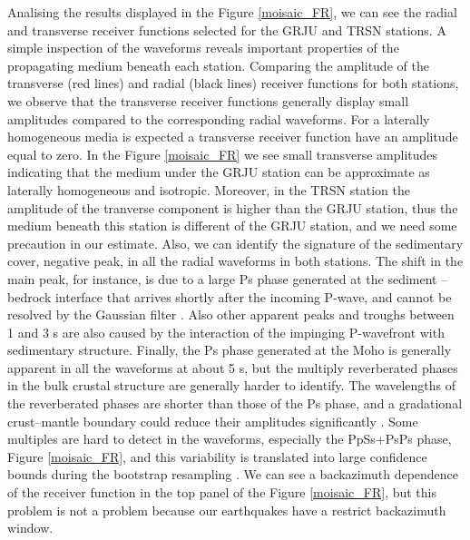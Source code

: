 \documentclass[paper,11pt]{geophysics}
\begin{document}
Analising the results displayed in the Figure \ref{moisaic_FR}, we can see the radial and transverse receiver functions selected for the GRJU and TRSN stations. A simple inspection of the waveforms reveals important properties of the propagating medium beneath each station. Comparing the amplitude of the transverse (red lines) and radial (black lines) receiver functions for both stations, we observe that the transverse receiver functions generally display small amplitudes compared to the corresponding radial waveforms. For a laterally homogeneous media is expected a transverse receiver function have an amplitude equal to zero. In the Figure \ref{moisaic_FR} we see small transverse amplitudes indicating that the medium under the GRJU station can be approximate as laterally homogeneous and isotropic. Moreover, in the TRSN station the amplitude of the tranverse component is higher than the GRJU station, thus the medium beneath this station is different of the GRJU station, and we need some precaution in our estimate. Also, we can identify the signature of the sedimentary cover, negative peak, in all the radial waveforms in both stations. The shift in the main peak, for instance, is due to a large Ps phase generated at the sediment – bedrock interface that arrives shortly after the incoming P-wave, and cannot be resolved by the Gaussian filter \citep{cassidy_numerical_1992}. Also other apparent peaks and troughs between 1 and 3 s are also caused by the interaction of the impinging P-wavefront with sedimentary structure. Finally, the Ps phase generated at the Moho is generally apparent in all the waveforms at about 5 s, but the multiply reverberated phases in the bulk crustal structure are generally harder to identify. The wavelengths of the reverberated phases are shorter than those of the Ps phase, and a gradational crust–mantle boundary could
reduce their amplitudes significantly \citep{julia_joint_2000}. Some multiples are hard to detect in the waveforms, especially the PpSs+PsPs phase, Figure \ref{moisaic_FR}, and this variability is translated into large confidence bounds during the bootstrap resampling \citep{julia_deep_2008}. We can see a backazimuth dependence of the receiver function in the top panel of the Figure \ref{moisaic_FR}, but this problem is not a problem because our earthquakes have a restrict backazimuth window. 
\end{document}
